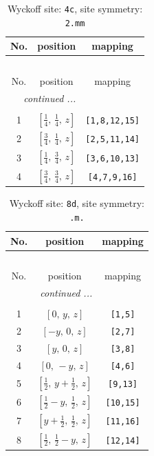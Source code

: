 \documentclass[fleqn,8pt]{jsarticle}
\begin{document}
\renewcommand{\arraystretch}{1.2}
\begin{longtable}{ccc}
\caption{Wyckoff site: {\tt 4c}, site symmetry: {\tt 2.mm}}
 \\
 \hline \hline
No. & position & mapping \\ \hline \endfirsthead

\multicolumn{2}{l}{\tablename\ \thetable{}} \\
 \hline \hline
No. & position & mapping \\ \hline \endhead

 \hline \hline
\multicolumn{2}{r}{\footnotesize\it continued ...} \\ \endfoot

 \hline \hline
\multicolumn{2}{r}{} \\ \endlastfoot

1 & $\left[ \frac{1}{4},\, \frac{1}{4},\, z \right]$ & {\tt [1,8,12,15]} \\ \hline
2 & $\left[ \frac{3}{4},\, \frac{1}{4},\, z \right]$ & {\tt [2,5,11,14]} \\ \hline
3 & $\left[ \frac{1}{4},\, \frac{3}{4},\, z \right]$ & {\tt [3,6,10,13]} \\ \hline
4 & $\left[ \frac{3}{4},\, \frac{3}{4},\, z \right]$ & {\tt [4,7,9,16]} \\
\end{longtable}
\renewcommand{\arraystretch}{1.2}
\begin{longtable}{ccc}
\caption{Wyckoff site: {\tt 8d}, site symmetry: {\tt .m.}}
 \\
 \hline \hline
No. & position & mapping \\ \hline \endfirsthead

\multicolumn{2}{l}{\tablename\ \thetable{}} \\
 \hline \hline
No. & position & mapping \\ \hline \endhead

 \hline \hline
\multicolumn{2}{r}{\footnotesize\it continued ...} \\ \endfoot

 \hline \hline
\multicolumn{2}{r}{} \\ \endlastfoot

1 & $\left[ 0,\, y,\, z \right]$ & {\tt [1,5]} \\ \hline
2 & $\left[ - y,\, 0,\, z \right]$ & {\tt [2,7]} \\ \hline
3 & $\left[ y,\, 0,\, z \right]$ & {\tt [3,8]} \\ \hline
4 & $\left[ 0,\, - y,\, z \right]$ & {\tt [4,6]} \\ \hline
5 & $\left[ \frac{1}{2},\, y + \frac{1}{2},\, z \right]$ & {\tt [9,13]} \\ \hline
6 & $\left[ \frac{1}{2} - y,\, \frac{1}{2},\, z \right]$ & {\tt [10,15]} \\ \hline
7 & $\left[ y + \frac{1}{2},\, \frac{1}{2},\, z \right]$ & {\tt [11,16]} \\ \hline
8 & $\left[ \frac{1}{2},\, \frac{1}{2} - y,\, z \right]$ & {\tt [12,14]} \\
\end{longtable}
\end{document}
